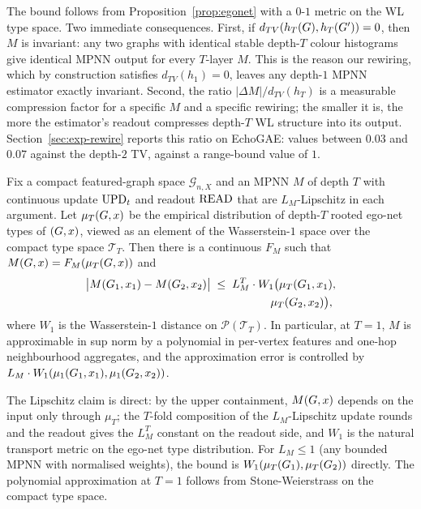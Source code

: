 The bound follows from Proposition~\ref{prop:egonet} with a
$0$-$1$ metric on the WL type space. Two immediate consequences.
First, if $d_{TV}(h_T(G), h_T(G')) = 0$, then $M$ is
invariant: any two graphs with identical stable depth-$T$
colour histograms give identical MPNN output for every $T$-layer
$M$. This is the reason our rewiring, which by construction
satisfies $d_{TV}(h_1) = 0$, leaves any depth-$1$ MPNN estimator
exactly invariant. Second, the ratio $|\Delta M| / d_{TV}(h_T)$
is a measurable compression factor for a specific $M$ and a
specific rewiring; the smaller it is, the more the estimator's
readout compresses depth-$T$ WL structure into its output.
Section~\ref{sec:exp-rewire} reports this ratio on EchoGAE:
values between $0.03$ and $0.07$ against the depth-$2$ TV,
against a range-bound value of $1$.

\begin{proposition}\label{prop:egonet}
Fix a compact featured-graph space $\mathcal{G}_{n,X}$ and an
MPNN $M$ of depth $T$ with continuous update $\mathrm{UPD}_t$ and readout
$\mathrm{READ}$ that are $L_M$-Lipschitz in each argument. Let
$\mu_T(G, x)$ be the empirical distribution of depth-$T$
rooted ego-net types of $(G, x)$, viewed as an element of the
Wasserstein-$1$ space over the compact type space
$\mathcal{T}_T$. Then there is a continuous $F_M$ such that
$M(G, x) = F_M(\mu_T(G, x))$ and
\begin{align*}
\bigl| M(G_1, x_1) - M(G_2, x_2) \bigr|
\;&\le\; L_M^T \cdot W_1\bigl(\mu_T(G_1, x_1), \\
&\qquad\qquad\quad\mu_T(G_2, x_2)\bigr),
\end{align*}
where $W_1$ is the Wasserstein-$1$ distance on
$\mathcal{P}(\mathcal{T}_T)$. In particular, at $T = 1$, $M$ is
approximable in sup norm by a polynomial in per-vertex features
and one-hop neighbourhood aggregates, and the approximation
error is controlled by $L_M \cdot W_1(\mu_1(G_1, x_1),
\mu_1(G_2, x_2))$.
\end{proposition}

The Lipschitz claim is direct: by the upper containment,
$M(G, x)$ depends on the input only through $\mu_T$; the
$T$-fold composition of the $L_M$-Lipschitz update rounds and
the readout gives the $L_M^T$ constant on the readout side, and
$W_1$ is the natural transport metric on the ego-net type
distribution. For $L_M \le 1$ (any bounded MPNN with normalised
weights), the bound is $W_1(\mu_T(G_1), \mu_T(G_2))$
directly. The polynomial approximation at $T = 1$ follows from
Stone-Weierstrass on the compact type space.

